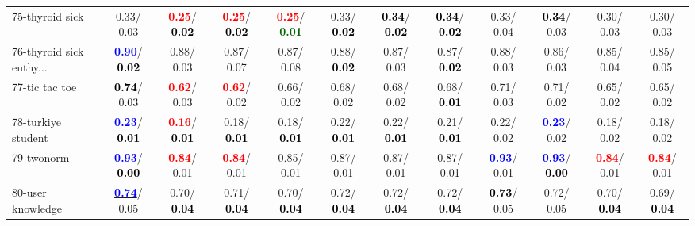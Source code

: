 \begin{table}[h]
\begin{center}
{\begin{tabular}{lc|c|c|c|c|c|c|c|c|c|c}
75-thyroid sick &   0.33/  0.03 & \textcolor{red}{\textbf{  0.25}}/\textcolor{black}{\textbf{  0.02}} & \textcolor{red}{\textbf{  0.25}}/\textcolor{black}{\textbf{  0.02}} & \textcolor{red}{\textbf{  0.25}}/\textcolor{darkgreen}{\textbf{  0.01}} &   0.33/\textcolor{black}{\textbf{  0.02}} & \textcolor{black}{\textbf{  0.34}}/\textcolor{black}{\textbf{  0.02}} & \textcolor{black}{\textbf{  0.34}}/\textcolor{black}{\textbf{  0.02}} &   0.33/  0.04 & \textcolor{black}{\textbf{  0.34}}/  0.03 &   0.30/  0.03 &   0.30/  0.03 \\
76-thyroid sick euthy... & \textcolor{blue}{\textbf{  0.90}}/\textcolor{black}{\textbf{  0.02}} &   0.88/  0.03 &   0.87/  0.07 &   0.87/  0.08 &   0.88/\textcolor{black}{\textbf{  0.02}} &   0.87/  0.03 &   0.87/\textcolor{black}{\textbf{  0.02}} &   0.88/  0.03 &   0.86/  0.03 &   0.85/  0.04 &   0.85/  0.05 \\
77-tic tac toe & \textcolor{black}{\textbf{  0.74}}/  0.03 & \textcolor{red}{\textbf{  0.62}}/  0.03 & \textcolor{red}{\textbf{  0.62}}/  0.02 &   0.66/  0.02 &   0.68/  0.02 &   0.68/  0.02 &   0.68/\textcolor{black}{\textbf{  0.01}} &   0.71/  0.03 &   0.71/  0.02 &   0.65/  0.02 &   0.65/  0.02 \\
78-turkiye student & \textcolor{blue}{\textbf{  0.23}}/\textcolor{black}{\textbf{  0.01}} & \textcolor{red}{\textbf{  0.16}}/\textcolor{black}{\textbf{  0.01}} &   0.18/\textcolor{black}{\textbf{  0.01}} &   0.18/\textcolor{black}{\textbf{  0.01}} &   0.22/\textcolor{black}{\textbf{  0.01}} &   0.22/\textcolor{black}{\textbf{  0.01}} &   0.21/\textcolor{black}{\textbf{  0.01}} &   0.22/  0.02 & \textcolor{blue}{\textbf{  0.23}}/  0.02 &   0.18/  0.02 &   0.18/  0.02 \\ \hline
79-twonorm & \textcolor{blue}{\textbf{  0.93}}/\textcolor{black}{\textbf{  0.00}} & \textcolor{red}{\textbf{  0.84}}/  0.01 & \textcolor{red}{\textbf{  0.84}}/  0.01 &   0.85/  0.01 &   0.87/  0.01 &   0.87/  0.01 &   0.87/  0.01 & \textcolor{blue}{\textbf{  0.93}}/  0.01 & \textcolor{blue}{\textbf{  0.93}}/\textcolor{black}{\textbf{  0.00}} & \textcolor{red}{\textbf{  0.84}}/  0.01 & \textcolor{red}{\textbf{  0.84}}/  0.01 \\
80-user knowledge & \underline{\textcolor{blue}{\textbf{  0.74}}}/  0.05 &   0.70/\textcolor{black}{\textbf{  0.04}} &   0.71/\textcolor{black}{\textbf{  0.04}} &   0.70/\textcolor{black}{\textbf{  0.04}} &   0.72/\textcolor{black}{\textbf{  0.04}} &   0.72/\textcolor{black}{\textbf{  0.04}} &   0.72/\textcolor{black}{\textbf{  0.04}} & \textcolor{black}{\textbf{  0.73}}/  0.05 &   0.72/  0.05 &   0.70/\textcolor{black}{\textbf{  0.04}} &   0.69/\textcolor{black}{\textbf{  0.04}} \\

\end{tabular}}
\end{center}
\end{table}
